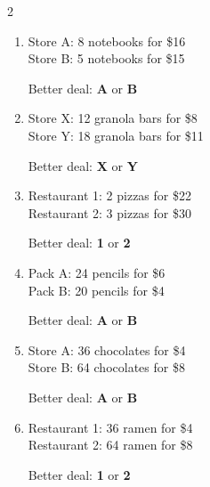 \documentclass[12pt, letterpaper, fleqn]{article}
\begin{document}
\begin{multicols}{2}
\begin{enumerate}[itemsep=2cm, leftmargin=0.6cm]
\item Store A: 8 notebooks for \$16\\
Store B: 5 notebooks for \$15\\

\vspace{1cm}

Better deal: \textbf{A} or \textbf{B}

\item Store X: 12 granola bars for \$8\\
Store Y: 18 granola bars for \$11\\

\vspace{1cm}

Better deal: \textbf{X} or \textbf{Y}

\item Restaurant 1: 2 pizzas for \$22\\
Restaurant 2: 3 pizzas for \$30\\

\vspace{1cm}

Better deal: \textbf{1} or \textbf{2}

\item Pack A: 24 pencils for \$6\\
Pack B: 20 pencils for \$4\\

\vspace{1cm}

Better deal: \textbf{A} or \textbf{B}

\item Store A: 36 chocolates for \$4\\
Store B: 64 chocolates for \$8\\

\vspace{1cm}

Better deal: \textbf{A} or \textbf{B}

\item Restaurant 1: 36 ramen for \$4\\
Restaurant 2: 64 ramen for \$8\\

\vspace{1cm}

Better deal: \textbf{1} or \textbf{2}

\end{enumerate}
\end{multicols}
\end{document}
